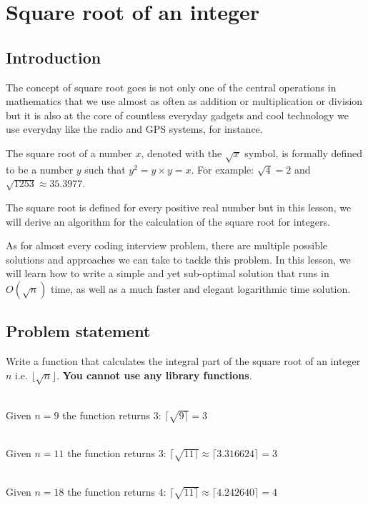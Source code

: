 %


\chapter{Square root of an integer}
\label{ch:square_root}
\section*{Introduction}

The concept of square root goes is not only one of the central operations in mathematics that we use almost as often as addition or multiplication or division but it is also at the core of countless everyday gadgets and cool technology we use everyday like the radio and GPS systems, for instance.

The square root of a number $x$, denoted with the $\sqrt{x}$ symbol, is formally defined to be a number $y$ such that $y^2 = y\times y=x$.
For example: $\sqrt{4} = 2$ and $\sqrt{1253} \approx 35.3977$.

The square root is defined for every positive real number but in this lesson, we will derive an algorithm for the calculation of the square root for integers.

As for almost every coding interview problem, there are multiple possible solutions and approaches we can take to tackle this problem. 
In this lesson, we will learn how to write a simple and yet sub-optimal solution that runs in $O(\sqrt{n})$ time,
as well as a much faster and elegant logarithmic time solution.


\section{Problem statement}
	\begin{exercise}
		Write a function that calculates the integral part of the square root of an integer $n$ i.e. $\lfloor \sqrt{n}\rfloor$.
		\textbf{You cannot use any library functions}.


	\begin{example}
	\hfill \\
	Given $n=9$ the function returns $3$: $\lceil\sqrt{9 \rceil}=3$
	\end{example}

	\begin{example}
		\hfill \\
		Given $n=11$ the function returns $3$: $\lceil\sqrt{11 \rceil}\approx\lceil3.316624 \rceil=3$
	\end{example}

	\begin{example}
		\hfill \\
		Given $n=18$ the function returns $4$: $\lceil\sqrt{11 \rceil}\approx\lceil4.242640 \rceil=4$
	\end{example}
	
\end{exercise}

